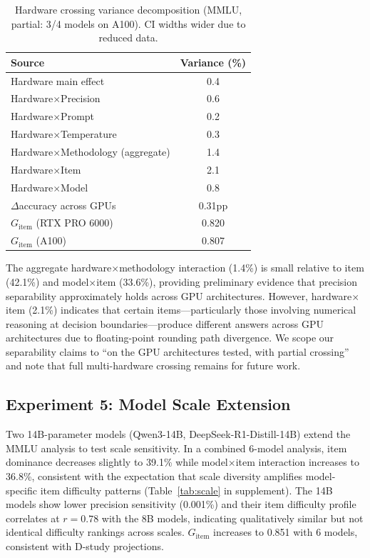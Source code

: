 \documentclass[11pt,letterpaper]{article}
\begin{document}
\begin{table}[t]
\centering
\caption{Hardware crossing variance decomposition (MMLU, partial: 3/4 models on A100). CI widths wider due to reduced data.}
\label{tab:hardware}
\small
\begin{tabular}{lc}
\toprule
\textbf{Source} & \textbf{Variance (\%)} \\
\midrule
Hardware main effect & 0.4 \\
Hardware$\times$Precision & 0.6 \\
Hardware$\times$Prompt & 0.2 \\
Hardware$\times$Temperature & 0.3 \\
Hardware$\times$Methodology (aggregate) & 1.4 \\
Hardware$\times$Item & 2.1 \\
Hardware$\times$Model & 0.8 \\
\midrule
$\Delta$accuracy across GPUs & 0.31pp \\
$G_{\text{item}}$ (RTX PRO 6000) & 0.820 \\
$G_{\text{item}}$ (A100) & 0.807 \\
\bottomrule
\end{tabular}
\end{table}

The aggregate hardware$\times$methodology interaction (1.4\%) is small relative to item (42.1\%) and model$\times$item (33.6\%), providing preliminary evidence that precision separability approximately holds across GPU architectures. However, hardware$\times$item (2.1\%) indicates that certain items---particularly those involving numerical reasoning at decision boundaries---produce different answers across GPU architectures due to floating-point rounding path divergence. We scope our separability claims to ``on the GPU architectures tested, with partial crossing'' and note that full multi-hardware crossing remains for future work.

\subsection{Experiment 5: Model Scale Extension}

Two 14B-parameter models (Qwen3-14B, DeepSeek-R1-Distill-14B) extend the MMLU analysis to test scale sensitivity. In a combined 6-model analysis, item dominance decreases slightly to 39.1\% while model$\times$item interaction increases to 36.8\%, consistent with the expectation that scale diversity amplifies model-specific item difficulty patterns (Table~\ref{tab:scale} in supplement). The 14B models show lower precision sensitivity (0.001\%) and their item difficulty profile correlates at $r = 0.78$ with the 8B models, indicating qualitatively similar but not identical difficulty rankings across scales. $G_{\text{item}}$ increases to 0.851 with 6 models, consistent with D-study projections.
\end{document}
